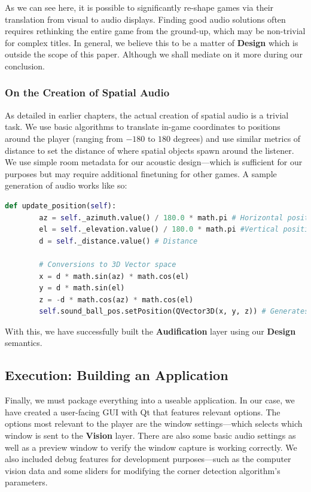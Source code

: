 \documentclass{report}
\newcommand{\design}{\textbf{Design}\xspace}
\newcommand{\vision}{\textbf{Vision}\xspace}
\newcommand{\audio}{\textbf{Audification}\xspace}
\begin{document}
As we can see here, it is possible to significantly re-shape games via their translation from visual to audio displays. Finding good audio solutions often requires rethinking the entire game from the ground-up, which may be non-trivial for complex titles. In general, we believe this to be a matter of \design which is outside the scope of this paper. Although we shall mediate on it more during our conclusion.

\subsubsection{On the Creation of Spatial Audio}
As detailed in earlier chapters, the actual creation of spatial audio is a trivial task. We use basic algorithms to translate in-game coordinates to positions around the player (ranging from $-180$ to $180$ degrees) and use similar metrics of distance to set the distance of where spatial objects spawn around the listener. We use simple room metadata for our acoustic design---which is sufficient for our purposes but may require additional finetuning for other games. A sample generation of audio works like so:

\begin{lstlisting}[language=python, caption={A sample of spatial audio generation}]
    def update_position(self):
        az = self._azimuth.value() / 180.0 * math.pi # Horizontal position 
        el = self._elevation.value() / 180.0 * math.pi #Vertical position 
        d = self._distance.value() # Distance 

        # Conversions to 3D Vector space
        x = d * math.sin(az) * math.cos(el) 
        y = d * math.sin(el)
        z = -d * math.cos(az) * math.cos(el)
        self.sound_ball_pos.setPosition(QVector3D(x, y, z)) # Generates sound position 
\end{lstlisting}

With this, we have successfully built the \audio layer using our \design semantics. 

\subsection{Execution: Building an Application}
Finally, we must package everything into a useable application. In our case, we have created a user-facing GUI with Qt that features relevant options. The options most relevant to the player are the window settings---which selects which window is sent to the \vision layer. There are also some basic audio settings as well as a preview window to verify the window capture is working correctly. We also included debug features for development purposes---such as the computer vision data and some sliders for modifying the corner detection algorithm's parameters.
\end{document}
